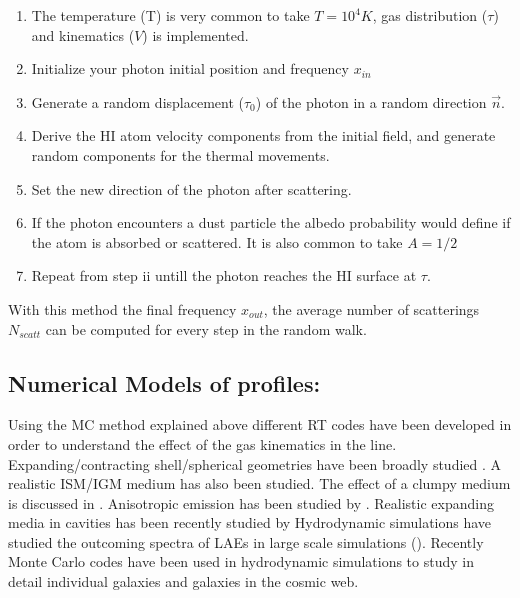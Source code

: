 \begin{enumerate}[i]
\item  The temperature (T) is very common to take $T=10^4K$, gas distribution ($\tau$) and kinematics ($V$) is implemented. 

\item Initialize your \ly photon initial position and frequency $x_{in}$

\item Generate a random displacement ($\tau_0$) of the photon in a random 
direction {\bf{$\vec{n}$}}.

\item  Derive the HI atom velocity components from the initial field, 
and generate random components for the thermal movements.

\item  Set the new direction of the \ly photon after scattering.

\item If the \ly photon encounters a dust particle the albedo probability 
would define if the atom is absorbed or scattered. It is also common to take $A=1/2$

\item Repeat from step ii untill the photon reaches the HI surface at $\tau$.  

\end{enumerate}

With this method the final frequency $x_{out}$, the average number of scatterings $N_{scatt}$ can be computed for every step in the random walk.


\subsection{Numerical Models of \ly profiles:}

Using the MC method explained above different RT  codes 
\citep{DijkstraKramer, Laursen09, Verhamme06, CLARA}
have been developed in order to understand the effect of the gas kinematics in
the \lya line. Expanding/contracting shell/spherical geometries
have been broadly studied \citep{Ahn03,Verhamme06,Dijkstra06}.
A realistic ISM/IGM medium has also been studied. The effect of a clumpy
medium is discussed in \citep{Hansen06}. Anisotropic \ly emission 
has been studied by \citep{Zheng2013}. Realistic expanding media 
in cavities has been recently studied by  \citep{Behrens2014} 
Hydrodynamic simulations have studied the outcoming spectra of
LAEs in large scale simulations (\cite{Forero12}). 
Recently Monte Carlo codes have been used in hydrodynamic 
simulations to study in detail individual galaxies and galaxies 
in the cosmic web.
\citep{Laursen09,Barnes11,Verhamme12,Yajima12}

